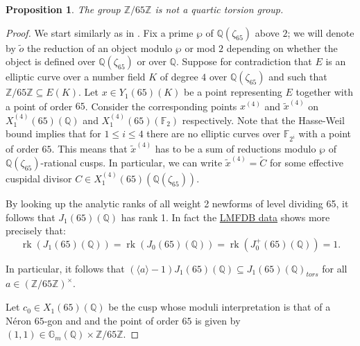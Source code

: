 \documentclass[11pt,reqno]{amsart}
\DeclareMathOperator{\rk}{rk}
\DeclareMathOperator{\gon}{gon}
\newtheorem{proposition}[theorem]{Proposition}
\theoremstyle{definition}
\numberwithin{equation}{section}
\newcommand{\Q}{\mathbb{Q}}
\newcommand{\Z}{\mathbb{Z}}
\newcommand{\F}{\mathbb{F}}
\def\torz#1{\mathbb Z /#1 \mathbb Z}
\newcommand{\diamondop}[1]{\langle #1 \rangle} %
\begin{document}


\begin{proposition}\label{prop:65}
    The group $\torz{65}$ is not a quartic torsion group.
\end{proposition}

\begin{proof}
We start similarly as in .  Fix a prime $\wp$ of $\Q(\zeta_{65})$ above $2$; we will denote by $\widetilde o$ the reduction of an object modulo $\wp$ or mod $2$ depending on whether the object is defined over $\Q(\zeta_{65})$ or over $\Q$.  Suppose for contradiction that $E$ is an elliptic curve over a number field $K$ of degree $4$ over $\Q(\zeta_{65})$ and such that $\torz{65} \subseteq E(K) $. Let $x\in Y_1(65)(K)$ be a point representing $E$ together with a point of order $65$. Consider the corresponding points $x^{(4)}$ and $\tilde{x}^{(4)}$ on $X_1^{(4)}(65)(\Q)$ and $ X_1^{(4)}(65)(\F_2)$ respectively. Note that the Hasse-Weil bound implies that for $1\leq i \leq 4$ there are no elliptic curves over $\F_{2^i}$ with a point of order $65$. This means that $\tilde{x}^{(4)}$ has to be a sum of reductions modulo $\wp$ of $\Q(\zeta_{65})$-rational cusps. In particular, we can write $\tilde{x}^{(4)}=\widetilde C$ for some effective cuspidal divisor $C \in X_1^{(4)}(65)(\Q(\zeta_{65}))$. 
    
By looking up the analytic ranks of all weight 2 newforms of level dividing 65, it follows that $J_1(65)(\Q)$ has rank 1. In fact the \href{https://www.lmfdb.org/ModularForm/GL2/Q/holomorphic/?level_type=divides&level=65&weight=2&showcol=char_order.analytic_rank}{LMFDB data} shows more precisely that:
$$\rk(J_1(65)(\Q))=\rk(J_0(65)(\Q))= \rk(J_0^+(65)(\Q))=1.$$ 

In particular, it follows that $(\diamondop{a}-1)J_1(65)(\Q) \subseteq J_1(65)(\Q)_{tors}$ for all $a \in (\torz{65})^\times$.

    Let $c_0 \in X_1(65)(\Q)$ be the cusp whose moduli interpretation is that of a N\'eron $65$-gon and and the point of order $65$ is given by $(1,1) \in \mathbb G_m(\Q) \times \Z/65\Z$. 


\end{proof}
\end{document}

